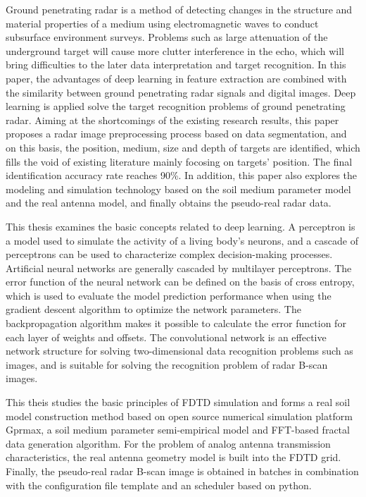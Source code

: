 
\begin{englishabstract}
	Ground penetrating radar is a method of detecting changes in the structure and material properties of a medium using electromagnetic waves to conduct subsurface environment surveys. Problems such as large attenuation of the underground target will cause more clutter interference in the echo, which will bring difficulties to the later data interpretation and target recognition. In this paper, the advantages of deep learning in feature extraction are combined with the similarity between ground penetrating radar signals and digital images. Deep learning is applied solve the target recognition problems of ground penetrating radar. Aiming at the shortcomings of the existing research results, this paper proposes a radar image preprocessing process based on data segmentation, and on this basis, the position, medium, size and depth of targets are identified, which fills the void of existing literature mainly focosing on targets' position. The final identification accuracy rate reaches 90\%. In addition, this paper also explores the modeling and simulation technology based on the soil medium parameter model and the real antenna model, and finally obtains the pseudo-real radar data.
	
	This thesis examines the basic concepts related to deep learning. A perceptron is a model used to simulate the activity of a living body's neurons, and a cascade of perceptrons can be used to characterize complex decision-making processes. Artificial neural networks are generally cascaded by multilayer perceptrons. The error function of the neural network can be defined on the basis of cross entropy, which is used to evaluate the model prediction performance when using the gradient descent algorithm to optimize the network parameters. The backpropagation algorithm makes it possible to calculate the error function for each layer of weights and offsets. The convolutional network is an effective network structure for solving two-dimensional data recognition problems such as images, and is suitable for solving the recognition problem of radar B-scan images. 
	
	This theis studies the basic principles of FDTD simulation and forms a real soil model construction method based on open source numerical simulation platform Gprmax, a soil medium parameter semi-empirical model and FFT-based fractal data generation algorithm. For the problem of analog antenna transmission characteristics, the real antenna geometry model is built into the FDTD grid. Finally, the pseudo-real radar B-scan image is obtained in batches in combination with the configuration file template and an scheduler based on python. 
	

\end{englishabstract}

